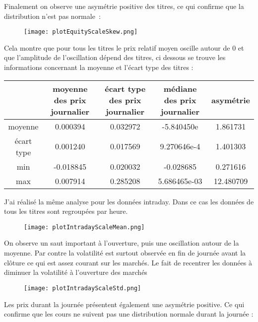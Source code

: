 \documentclass[12pt]{scrartcl} %
\begin{document}
\newline
Finalement on observe une asymétrie positive des titres, ce qui confirme que la distribution n'est pas normale~:
\newline
\begin{figure}[!h]
\centering
\texttt{[image: plotEquityScaleSkew.png]}
\end{figure}
\newline
Cela montre que pour tous les titres le prix relatif moyen oscille autour de 0 et que l'amplitude de l'oscillation dépend des titres, ci dessous se trouve les informations concernant la moyenne et l'écart type des titres : 
\begin{table}[h!]
\centering
\begin{adjustbox}{max width=\textwidth}
\begin{tabular}{|c|c|c|c|c|}
& moyenne des prix journalier & écart type des prix journalier & médiane des prix journalier & asymétrie\\
\hline
moyenne & 0.000394 & 0.032972 & -5.840450e & 1.861731\\
écart type & 0.001240 &  0.017569 &  9.270646e-4 & 1.401303 \\
min & -0.018845 & 0.020032 & -0.028685 & 0.271616\\
max & 0.007914 & 0.285208 & 5.686465e-03 & 12.480709
\end{tabular}
\end{adjustbox}
\end{table}
\newline
J'ai réalisé la même analyse pour les données intraday. Dans ce cas les données de tous les titres sont regroupées par heure. 
\begin{figure}[!h]
\centering
\texttt{[image: plotIntradayScaleMean.png]}
\end{figure}
\newline 
On observe un saut important à l'ouverture, puis une oscillation autour de la moyenne.
\newline
Par contre la volatilité est surtout observée en fin de journée avant la clôture ce qui est assez courant sur les marchés. Le fait de  recentrer les données à diminuer la volatilité à l'ouverture des marchés
\begin{figure}[!h]
\centering
\texttt{[image: plotIntradayScaleStd.png]}
\end{figure}
\newline
Les prix durant la journée présentent également une asymétrie positive. Ce qui confirme que les cours ne suivent pas une distribution normale durant la journée : 
\end{document}

